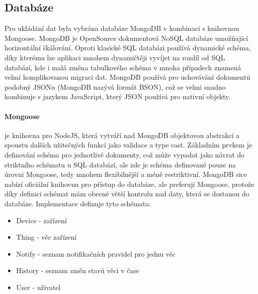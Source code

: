 \subsection{Databáze}
Pro ukládání dat byla vybrána databáze MongoDB v kombinaci s knihovnou Mongoose. MongoDB je OpenSource dokumentová NoSQL databáze umožňující horizontální škálování. Oproti klasické SQL databázi používá dynamické schéma, díky kterému lze aplikaci mnohem dynamičtěji vyvíjet na rozdíl od SQL databází, kde i malá změna tabulkového schéma v mnoha případech znamená velmi komplikovanou migraci dat. MongoDB používá pro uchovávání dokumentů podobný JSONu (MongoDB nazývá formát BSON), což se velmi snadno kombinuje s jazykem JavaScript, který JSON používá pro nativní objekty.

\paragraph{Mongoose} je knihovna pro NodeJS, která vytváří nad MongoDB objektovou abstrakci a spoustu dalších užitečných funkcí jako validace a type cast. Základním prvkem je definování schéma pro jednotlivé dokumenty, což může vypadat jako návrat do striktního schématu u SQL databází, ale zde je schéma definované pouze na úrovni Mongoose, tedy mnohem flexibilnější a méně restriktivní. MongoDB sice nabízí oficiální knihovnu pro přístup do databáze, ale preferuji Mongoose, protože díky definici schémat mám obecně větší kontrolu nad daty, která se dostanou do databáze. Implementace definuje tyto schémata:
\begin{itemize}
    \item Device - zařízení
    \item Thing - věc zařízení
    \item Notify - seznam notifikačních pravidel pro jednu věc
    \item History - seznam změn stavů věci v čase
    \item User - uživatel
\end{itemize}

